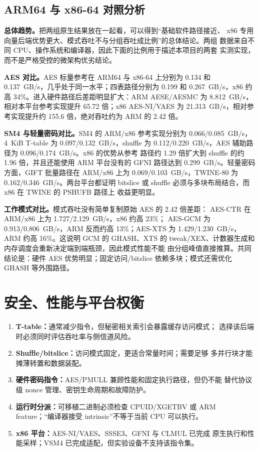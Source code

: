 \documentclass[11pt,a4paper,UTF8,fontset=none]{ctexart}
\begin{document}
\FloatBarrier
\subsection{ARM64 与 x86-64 对照分析}

\textbf{总体趋势。}把两组原生结果放在一起看，可以得到“基础软件路径接近、
x86 专用向量后端优势更大、模式吞吐不与分组吞吐成比例”的总体结论。两组
数据来自不同 CPU、操作系统和编译器，因此下面的比例用于描述本项目的两套
实测实现，而不是严格受控的微架构优劣结论。

\textbf{AES 对比。}AES 标量参考在 ARM64 与 x86-64 上分别为 0.134 和
0.137~GB/s，几乎处于同一水平；四表路径分别为 0.199 和
0.267~GB/s，x86 约高 34\%。进入硬件路径后差距明显扩大：ARM
AESE/AESMC 为 8.812~GB/s，相对本平台参考实现提升 65.72 倍；x86
AES-NI/VAES 为 21.313~GB/s，相对参考实现提升约 155.6 倍，绝对吞吐约为
ARM 的 2.42 倍。

\textbf{SM4 与轻量密码对比。}SM4 的 ARM/x86 参考实现分别为
0.066/0.085~GB/s，4~KiB T-table 为 0.097/0.132~GB/s，shuffle 为
0.112/0.220~GB/s，AES 辅助路径为 0.096/0.174~GB/s。x86 的优势从参考
路径约 1.29 倍扩大到 shuffle 的约 1.96 倍，并且还能使用 ARM 平台没有的
GFNI 路径达到 0.299~GB/s。轻量密码方面，GIFT 批量路径在 ARM/x86 上为
0.069/0.103~GB/s，TWINE-80 为 0.162/0.346~GB/s。两台平台都证明
bitslice 或 shuffle 必须与多块布局结合，而 x86 在 TWINE 的 PSHUFB 路径上
收益更明显。

\textbf{工作模式对比。}模式吞吐没有简单复制原始 AES 的 2.42 倍差距：
AES-CTR 在 ARM/x86 上为 1.727/2.129~GB/s，x86 约高 23\%；
AES-GCM 为 0.913/0.806~GB/s，ARM 反而约高 13\%；AES-XTS 为
1.429/1.230~GB/s，ARM 约高 16\%。这说明 GCM 的 GHASH、XTS 的
tweak/XEX、计数器生成和内存调度会重新决定端到端瓶颈，因此模式性能不能
由分组峰值直接推算。共同结论是：硬件 AES 优势明显；固定访问/bitslice
依赖多块；模式还需优化 GHASH 等外围路径。

\section{安全、性能与平台权衡}

\begin{enumerate}
  \item \textbf{T-table：}通常减少指令，但秘密相关索引会暴露缓存访问模式；
  选择该后端时必须同时评估吞吐率与侧信道风险。
  \item \textbf{Shuffle/bitslice：}访问模式固定，更适合常量时间；需要足够
  多并行块才能摊薄转置和数据装配。
  \item \textbf{硬件密码指令：}AES/PMULL 兼顾性能和固定执行路径，但仍不能
  替代协议级 nonce 管理、密钥生命周期和故障防护。
  \item \textbf{运行时分派：}可移植二进制必须检查 CPUID/XGETBV 或 ARM
  feature；“编译器接受 intrinsic”不等于当前 CPU 可以执行。
  \item \textbf{x86 平台：}AES-NI/VAES、SSSE3、GFNI 与 CLMUL 已完成
  原生执行和性能采样；VSM4 已完成适配，但实验设备不支持该指令集。
\end{enumerate}
\end{document}
